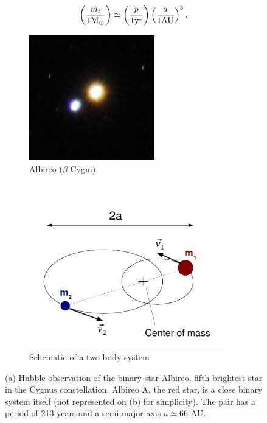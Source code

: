 \begin{equation}
\left( \frac{m_t}{1 {\textrm{M}_\odot}} \right) \simeq \left( \frac{p}{1 \textrm{yr}} \right) \left( \frac{a}{1 \textrm{AU}} \right)^3 .
\end{equation}



\begin{figure}
\center
    \centering
    \begin{subfigure}[b]{0.48\textwidth}
    	\centering
        \includegraphics[width=0.6\textwidth]{Figures/0_albireo.jpg}
        \caption{Albireo ($\beta$ Cygni)}
        \label{Fig:0_binary_1}
    \end{subfigure}
    ~~
    \begin{subfigure}[b]{0.48\textwidth}
    	\centering
        \includegraphics[width=0.93\textwidth]{Figures/0_elliptictrajectories.png}
        \caption{Schematic of a two-body system}
        \label{Fig:0_binary_2}
    \end{subfigure}
\caption{(a) Hubble observation of the binary star Albireo, fifth brightest star in the Cygnus constellation. Albireo A, the red star, is a close binary system itself (not represented on (b) for simplicity). The pair has a period of 213 years and a semi-major axis $a \simeq 66$ AU. }
\label{Fig:0_binary}
\end{figure}





